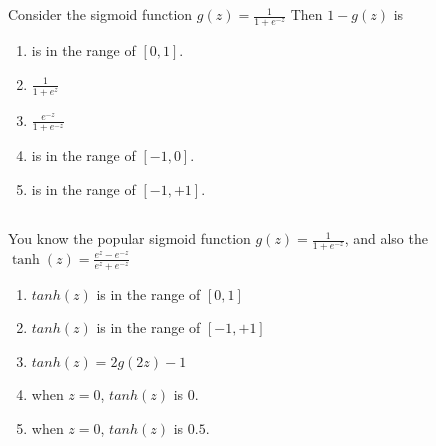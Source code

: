 \begin{frame}
\section{}
Consider the sigmoid function $g(z) = \frac{1}{1+ e^{-z}}$
   Then $1-g(z)$ is
    \begin{enumerate}[label=(\Alph*)]
      \item is in the range of $[0,1]$.   %
      \item $\frac{1}{1+e^z}$
      \item $\frac{e^{-z}}{1+e^{-z}}$   %
      \item is in the range of $[-1,0]$.
      \item is in the range of $[-1,+1]$.   %
    \end{enumerate}
\end{frame}

\begin{frame}
\section{}
  You know the popular sigmoid function $g(z) = \frac{1}{1+ e^{-z}}$, and also the $\tanh(z) = \frac{e^{z} - e^{-z}}{e^{z}+e^{-z}}$
     \begin{enumerate}[label=(\Alph*)]
       \item $tanh(z)$ is in the range of $[0,1]$
      \item $tanh(z)$ is in the range of $[-1,+1]$    %
      \item $tanh(z) = 2g(2z) - 1$    %
      \item when $z=0$, $tanh(z)$ is $0$.   %
      \item when $z=0$, $tanh(z)$ is $0.5$.
     \end{enumerate}
\end{frame}

